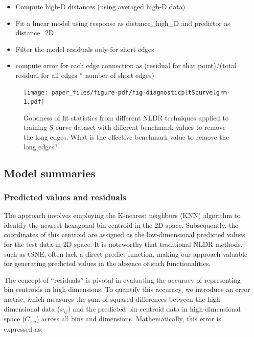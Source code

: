 \documentclass[
  12pt]{article}
\providecommand{\tightlist}{%
  \setlength{\itemsep}{0pt}\setlength{\parskip}{0pt}}\usepackage{longtable,booktabs,array}
\begin{document}
\begin{itemize}
\tightlist
\item
  Compute high-D distances (using averaged high-D data)
\item
  Fit a linear model using response as distance\_high\_D and predictor
  as distance\_2D
\item
  Filter the model residuals only for short edges
\item
  compute error for each edge connection as (residual for that
  point)/(total residual for all edges * number of short edges)
\end{itemize}

\begin{figure}

{\centering \texttt{[image: paper\_files/figure-pdf/fig-diagnosticpltScurvelgrm-1.pdf]}

}

\caption{\label{fig-diagnosticpltScurvelgrm}Goodness of fit statistics
from different NLDR techniques applied to training S-curve dataset with
different benchmark values to remove the long edges. What is the
effective benchmark value to remove the long edges?}

\end{figure}

\hypertarget{sec-summary}{%
\subsection{Model summaries}\label{sec-summary}}

\hypertarget{predicted-values-and-residuals}{%
\subsubsection{Predicted values and
residuals}\label{predicted-values-and-residuals}}

The approach involves employing the K-nearest neighbors (KNN) algorithm
to identify the nearest hexagonal bin centroid in the 2D space.
Subsequently, the coordinates of this centroid are assigned as the
low-dimensional predicted values for the test data in 2D space. It is
noteworthy that traditional NLDR methods, such as tSNE, often lack a
direct predict function, making our approach valuable for generating
predicted values in the absence of such functionalities.

The concept of ``residuals'' is pivotal in evaluating the accuracy of
representing bin centroids in high dimensions. To quantify this
accuracy, we introduce an error metric, which measures the sum of
squared differences between the high-dimensional data (\(x_{ij}\)) and
the predicted bin centroid data in high-dimensional space (\(C_{x_ij}\))
across all bins and dimensions. Mathematically, this error is expressed
as:
\end{document}
